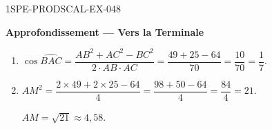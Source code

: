 \begin{corrige}{1SPE-PRODSCAL-EX-048}
\begin{center}\textbf{Approfondissement — Vers la Terminale}\end{center}
\begin{enumerate}
\item $\cos\widehat{BAC} = \dfrac{AB^2+AC^2-BC^2}{2 \cdot AB \cdot AC} = \dfrac{49+25-64}{70} = \dfrac{10}{70} = \dfrac{1}{7}$.
\item $AM^2 = \dfrac{2 \times 49 + 2 \times 25 - 64}{4} = \dfrac{98 + 50 - 64}{4} = \dfrac{84}{4} = 21$.

$AM = \sqrt{21} \approx 4{,}58$.
\end{enumerate}
\end{corrige}
